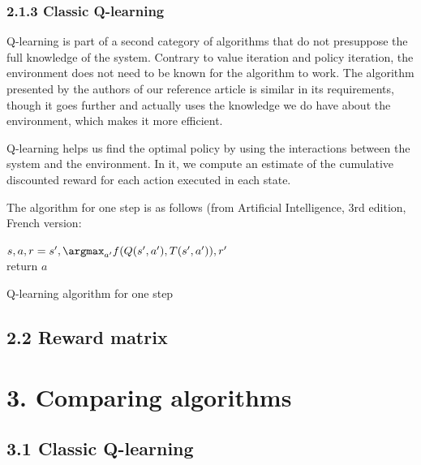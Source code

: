 \documentclass[a4paper, 12pt]{report}
\begin{document}
\subsection*{2.1.3 Classic Q-learning}

Q-learning is part of a second category of algorithms that do not presuppose the full knowledge of the system.
Contrary to value iteration and policy iteration, the environment does not need to be known for the algorithm to work.
The algorithm presented by the authors of our reference article is similar in its requirements, though it goes further and
actually uses the knowledge we do have about the environment, which makes it more efficient.

Q-learning helps us find the optimal policy by using the interactions between the system and the environment.
In it, we compute an estimate of the cumulative discounted reward for each action executed in each state.

The algorithm for one step is as follows (from Artificial Intelligence, 3rd edition, French version\cite{Russell-2010}:

\begin{algorithm}[H]
  $s,a,r=s',\argmax_{a'}f(Q(s',a'),T(s',a')),r'$\\
  return $a$
\caption{Q-learning algorithm for one step}
\end{algorithm}

\section*{2.2 Reward matrix}

\chapter*{3. Comparing algorithms}

\section*{3.1 Classic Q-learning}
\end{document}
